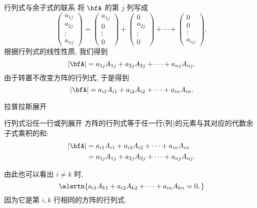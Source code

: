 \begin{frame}{行列式与余子式的联系}
	\onslide<+->
	将 $\bfA$ 的第 $j$ 列写成
	\[\begin{pmatrix}
		a_{1j}\\a_{2j}\\\vdots\\a_{nj}
	\end{pmatrix}
	=\begin{pmatrix}
		a_{1j}\\0\\\vdots\\0
	\end{pmatrix}
	+\begin{pmatrix}
		0\\a_{2j}\\\vdots\\0
	\end{pmatrix}+\cdots+\begin{pmatrix}
		0\\0\\\vdots\\a_{nj}
	\end{pmatrix},\]
	\onslide<+->
	根据行列式的线性性质, 我们得到
	\[|\bfA|=a_{1j}A_{1j}+a_{2j}A_{2j}+\cdots+a_{nj}A_{nj}.\]
	\onslide<+->
	由于转置不改变方阵的行列式, 于是得到
	\[|\bfA|=a_{i1}A_{i1}+a_{i2}A_{i2}+\cdots+a_{in}A_{in}.\]
\end{frame}


\begin{frame}{拉普拉斯展开}
	\onslide<+->
	\begin{algorithm}{行列式沿任一行或列展开}
		方阵的行列式等于任一行(列)的元素与其对应的代数余子式乘积的和:
		\begin{align*}
			|\bfA|&=a_{i1}A_{i1}+a_{i2}A_{i2}+\cdots+a_{in}A_{in}\\
			&=a_{1j}A_{1j}+a_{2j}A_{2j}+\cdots+a_{nj}A_{nj}.
		\end{align*}
	\end{algorithm}
	\onslide<+->
	由此也可以看出 \alert{$i\neq k$ 时,}
	\[\alertn{a_{i1}A_{k1}+a_{i2}A_{k2}+\cdots+a_{in}A_{kn}=0,}\]
	\onslide<+->
	因为它是第 $i,k$ 行相同的方阵的行列式.
\end{frame}


